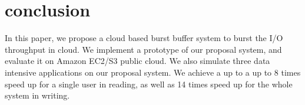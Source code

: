 \section{conclusion}
\label{sec:conclusion}
In this paper, we propose a cloud based burst buffer system to burst the I/O throughput in cloud.
We implement a prototype of our proposal system, and evaluate it on Amazon EC2/S3 public cloud.
We also simulate three data intensive applications on our proposal system.
We achieve a up to a up to 8 times speed up for a single user in reading, as well as 14 times speed
up for the whole system in writing.

